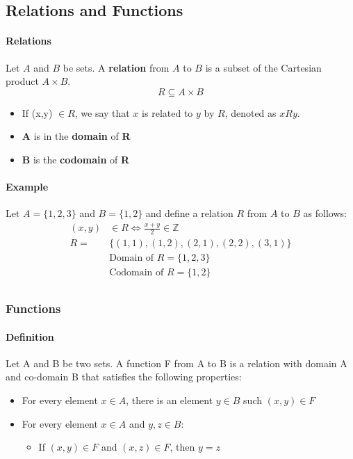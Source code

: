 \subsection{Relations and Functions}

\paragraph*{Relations}
Let $A$ and $B$ be sets. A \textbf{relation} from $A$ to $B$ is a subset of the Cartesian product $A\times B$.\\
\begin{equation*}
    R \subseteq A\times B
\end{equation*}
\begin{itemize}
    \item If (x,y) $\in R$, we say that $x$ is related to $y$ by $R$, denoted as $xRy$.
    \item \textbf{A} is in the \textbf{domain} of \textbf{R}
    \item \textbf{B} is the \textbf{codomain} of \textbf{R}
\end{itemize}

\paragraph*{Example}
Let $A = \{1,2,3\}$ and $B = \{1,2\}$ and define a relation $R$ from $A$ to $B$ as follows:
\begin{align*}
    (x,y) &\in R \iff \frac{x+y}{2} \in \mathbb{Z}\\
    R = &\{(1,1), (1,2), (2,1), (2,2), (3,1)\}\\
        &\text{Domain of } R = \{1,2,3\}\\
        &\text{Codomain of } R = \{1,2\}\\
\end{align*}

\subsubsection*{Functions}
\paragraph*{Definition}
Let A and B be two sets. A function F from A to B is a relation with domain A and co-domain B that satisfies the following properties:
\begin{itemize}
    \item For every element $x \in A$, there is an element $y \in B$ such $(x,y) \in F$
    \item For every element $x \in A$ and $y,z \in B$:
    \begin{itemize}
        \item If $(x,y) \in F$ and $(x,z) \in F$, then $y=z$
    \end{itemize}
\end{itemize}
\pagebreak
